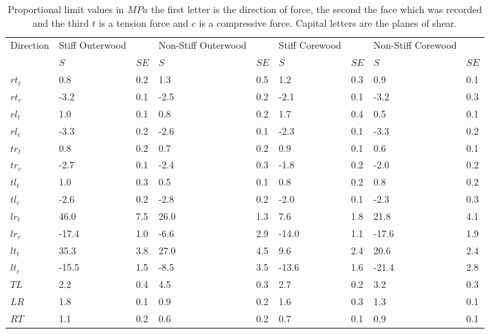 \documentclass[10pt]{article}
\begin{document}
\begin{table}
\caption[Proportional limits]{Proportional limit values in \(MPa\) the first letter is the direction of force, the second the face which was recorded and the third \(t\) is a tension force and \(c\) is a compressive force. Capital letters are the planes of shear.}
\label{table:yield points}
\begin{tabular}{lllllllll}
\hline
Direction & Stiff Outerwood && Non-Stiff Outerwood && Stiff Corewood && Non-Stiff Corewood & \\
 & \(S\)&\(SE\)& \(S\)&\(SE\)& \(S\)&\(SE\)& \(S\)&\(SE\)\\
\hline
\(rt_t\) & 0.8 & 0.2& 1.3& 0.5& 1.2 & 0.3& 0.9 & 0.1 \\
\(rt_c\) & -3.2 & 0.1& -2.5& 0.2& -2.1 & 0.1& -3.2 & 0.3 \\
\(rl_t\) & 1.0 & 0.1& 0.8& 0.2& 1.7 & 0.4& 0.5 & 0.1 \\
\(rl_c\) & -3.3 & 0.2& -2.6& 0.1&-2.3 & 0.1& -3.3 & 0.2 \\
\(tr_t\) & 0.8 & 0.2& 0.7& 0.2& 0.9 & 0.1& 0.6 & 0.1 \\
\(tr_c\) & -2.7 & 0.1& -2.4& 0.3& -1.8 & 0.2& -2.0 & 0.2 \\
\(tl_t\) & 1.0 & 0.3& 0.5& 0.1& 0.8 & 0.2& 0.8 & 0.2 \\
\(tl_c\) & -2.6 & 0.2& -2.8& 0.2& -2.0 & 0.1& -2.3 & 0.3 \\
\(lr_t\) & 46.0 & 7.5& 26.0& 1.3& 7.6 & 1.8& 21.8 & 4.1 \\
\(lr_c\) & -17.4 & 1.0& -6.6& 2.9& -14.0 & 1.1& -17.6 & 1.9 \\
\(lt_t\) & 35.3 & 3.8& 27.0& 4.5& 9.6 & 2.4& 20.6 & 2.4 \\
\(lt_c\) & -15.5 & 1.5& -8.5& 3.5& -13.6 & 1.6& -21.4 & 2.8 \\
\(TL\) & 2.2 & 0.4& 4.5& 0.3& 2.7 & 0.2&3.2 & 0.3 \\
\(LR\) & 1.8 & 0.1& 0.9& 0.2& 1.6 & 0.3& 1.3 & 0.1 \\
\(RT\) & 1.1 & 0.2& 0.6& 0.2& 0.7 & 0.1& 0.9 & 0.1 \\
\hline
\end{tabular}
\end{table}
\end{document}
